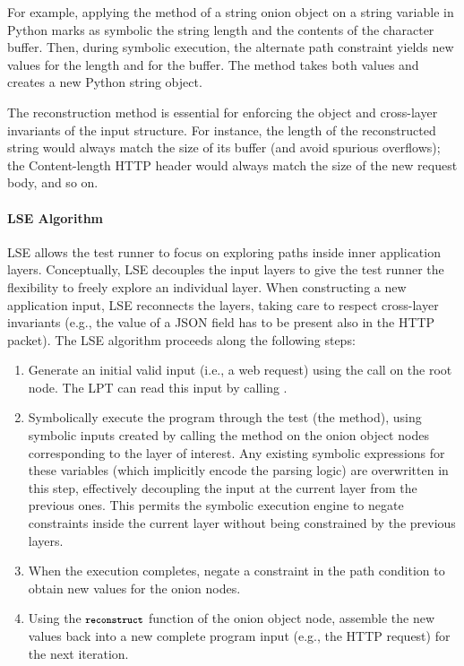 For example, applying the  method of a string onion object on a string variable in Python marks as symbolic the string length and the contents of the character buffer.  Then, during symbolic execution, the alternate path constraint yields new values for the length and for the buffer.  The  method takes both values and creates a new Python string object.

The reconstruction method is essential for enforcing the object and cross-layer invariants of the input structure.  For instance, the length of the reconstructed string would always match the size of its buffer (and avoid spurious overflows); the Content-length HTTP header would always match the size of the new request body, and so on.

\paragraph{LSE Algorithm}

LSE allows the test runner to focus on exploring paths inside inner application layers. Conceptually, LSE decouples the input layers to give the test runner the flexibility to freely explore an individual layer. When constructing a new application input, LSE reconnects the layers, taking care to respect cross-layer invariants (e.g., the value of a JSON field has to be present also in the HTTP packet).
%
The LSE algorithm proceeds along the following steps:
\begin{enumerate}
\item Generate an initial valid input (i.e., a web request) using the
   call on the root node.  The LPT can read this
  input by calling .
%
\item Symbolically execute the program through the test (the
   method), using symbolic inputs created by calling
  the  method on the onion object nodes
  corresponding to the layer of interest.  
%
  Any existing symbolic expressions for these variables (which
  implicitly encode the parsing logic) are overwritten in this step,
  effectively decoupling the input at the current layer from the
  previous ones.  This permits the symbolic execution engine to negate
  constraints inside the current layer without being constrained
  by the previous layers.
%
\item When the execution completes, negate a constraint in the path
  condition to obtain new values for the onion nodes.
%
\item Using the $\texttt{\footnotesize \bfseries reconstruct}$ function of the onion object
  node, assemble the new values back into a new complete program input
  (e.g., the HTTP request) for the next iteration.
\end{enumerate}

